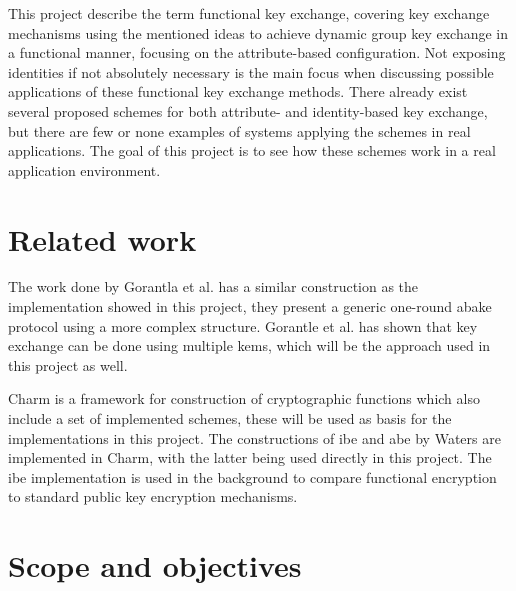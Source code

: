 \par This project describe the term functional key exchange, covering key exchange mechanisms using the mentioned ideas to achieve dynamic group key exchange in a functional manner, focusing on the attribute-based configuration. Not exposing identities if not absolutely necessary is the main focus when discussing possible applications of these functional key exchange methods. There already exist several proposed schemes for both attribute- and identity-based key exchange, but there are few or none examples of systems applying the schemes in real applications. The goal of this project is to see how these schemes work in a real application environment.

\section{Related work}\label{sec:related_work}
The work done by Gorantla et al.\cite{gorantla2010attribute} has a similar construction as the implementation showed in this project, they present a generic one-round \gls{abake} protocol using a more complex structure. Gorantle et al. \cite{kem-group-ke} has shown that key exchange can be done using multiple \glspl{kem}, which will be the approach used in this project as well.
\par Charm \cite{DBLP:Charm13} is a framework for construction of cryptographic functions which also include a set of implemented schemes, these will be used as basis for the implementations in this project. The constructions of \gls{ibe} and \gls{abe} by Waters \cite{ibe_waters09, abe_waters09} are implemented in Charm, with the latter being used directly in this project. The \gls{ibe} implementation is used in the background to compare functional encryption to standard public key encryption mechanisms.

\section{Scope and objectives}\label{sec:scope}

